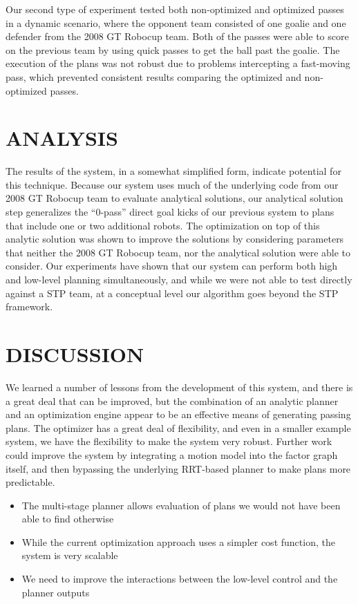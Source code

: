 \documentclass[a4paper, 10pt, conference]{ieeeconf}      %
\begin{document}
Our second type of experiment tested both non-optimized and optimized passes in a dynamic scenario, where the opponent team consisted of one goalie and one defender from the 2008 GT Robocup team. Both of the passes were able to score on the previous team by using quick passes to get the ball past the goalie. The execution of the plans was not robust due to problems intercepting a fast-moving pass, which prevented consistent results comparing the optimized and non-optimized passes.

\section{ANALYSIS}
The results of the system, in a somewhat simplified form, indicate potential for this technique. Because our system uses much of the underlying code from our 2008 GT Robocup team to evaluate analytical solutions, our analytical solution step generalizes the ``0-pass'' direct goal kicks of our previous system to plans that include one or two additional robots. The optimization on top of this analytic solution was shown to improve the solutions by considering parameters that neither the 2008 GT Robocup team, nor the analytical solution were able to consider.
Our experiments have shown that our system can perform both high and low-level planning simultaneously, and while we were not able to test directly against a STP team, at a conceptual level our algorithm goes beyond the STP framework.

\section{DISCUSSION}
We learned a number of lessons from the development of this system, and there is a great deal that can be improved, but the combination of an analytic planner and an optimization engine appear to be an effective means of generating passing plans.  The optimizer has a great deal of flexibility, and even in a smaller example system, we have the flexibility to make the system very robust.  Further work could improve the system by integrating a motion model into the factor graph itself, and then bypassing the underlying RRT-based planner to make plans more predictable. 
\begin{itemize}
\item The multi-stage planner allows evaluation of plans we would not have been able to find otherwise
\item While the current optimization approach uses a simpler cost function, the system is very scalable
\item We need to improve the interactions between the low-level control and the planner outputs
\end{itemize}
\end{document}
